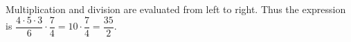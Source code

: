 Multiplication and division are evaluated from left to right. Thus the expression is $\dfrac{4\cdot5\cdot3}{6}\cdot\dfrac{7}{4}=10\cdot\dfrac{7}{4}=\boxed{\dfrac{35}{2}}$.
